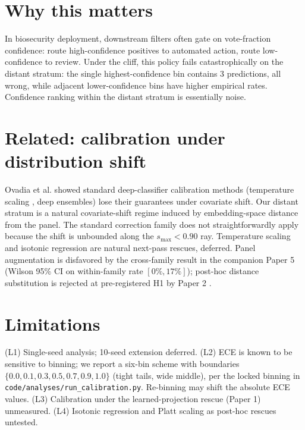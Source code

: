 \documentclass[11pt]{article}
\begin{document}
\section{Why this matters}
In biosecurity deployment, downstream filters often gate on vote-fraction confidence: route high-confidence positives to automated action, route low-confidence to review. Under the cliff, this policy fails catastrophically on the distant stratum: the single highest-confidence bin contains 3 predictions, all wrong, while adjacent lower-confidence bins have higher empirical rates. Confidence ranking within the distant stratum is essentially noise.

\section{Related: calibration under distribution shift}
Ovadia et al. \cite{ovadia2019shift} showed standard deep-classifier calibration methods (temperature scaling \cite{guo2017calibration}, deep ensembles) lose their guarantees under covariate shift. Our distant stratum is a natural covariate-shift regime induced by embedding-space distance from the panel. The standard correction family \cite{guo2017calibration} does not straightforwardly apply because the shift is unbounded along the $s_{\max} < 0.90$ ray. Temperature scaling \cite{guo2017calibration} and isotonic regression \cite{guo2017calibration} are natural next-pass rescues, deferred. Panel augmentation is disfavored by the cross-family result in the companion Paper 5 (Wilson 95\% CI on within-family rate $[0\%, 17\%]$); post-hoc distance substitution is rejected at pre-registered H1 by Paper 2 \cite{ledoit2004,amari2016,weinberger2009distance,schroff2015facenet,lin2023evolutionary}.

\section{Limitations}
(L1) Single-seed analysis; 10-seed extension deferred. (L2) ECE is known to be sensitive to binning; we report a six-bin scheme with boundaries $\{0.0, 0.1, 0.3, 0.5, 0.7, 0.9, 1.0\}$ (tight tails, wide middle), per the locked binning in \texttt{code/analyses/run\_calibration.py}. Re-binning may shift the absolute ECE values. (L3) Calibration under the learned-projection rescue (Paper 1) unmeasured. (L4) Isotonic regression and Platt scaling as post-hoc rescues untested.


\end{document}
